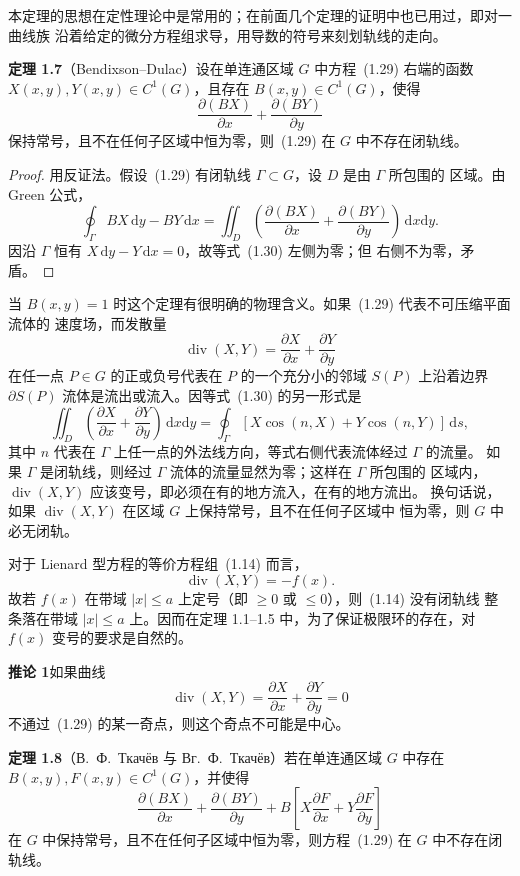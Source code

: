 本定理的思想在定性理论中是常用的；在前面几个定理的证明中也已用过，即对一曲线族
沿着给定的微分方程组求导，用导数的符号来刻划轨线的走向。

\noindent\textbf{定理 1.7}\quad （Bendixson--Dulac）设在单连通区域 $G$ 中方程~(1.29)
右端的函数 $X(x,y),Y(x,y)\in C^1(G)$，且存在 $B(x,y)\in C^1(G)$，使得
\[
  \dfrac{\partial(BX)}{\partial x}+\dfrac{\partial(BY)}{\partial y}
\]
保持常号，且不在任何子区域中恒为零，则~(1.29) 在 $G$ 中不存在闭轨线。

\begin{proof}
用反证法。假设~(1.29) 有闭轨线 $\Gamma\subset G$，设 $D$ 是由 $\Gamma$ 所包围的
区域。由 Green 公式，
\[
  \oint_\Gamma BX\,\mathrm{d}y-BY\,\mathrm{d}x
  =\iint_D\left(\dfrac{\partial(BX)}{\partial x}
  +\dfrac{\partial(BY)}{\partial y}\right)\,\mathrm{d}x\mathrm{d}y. \tag{1.30}
\]
因沿 $\Gamma$ 恒有 $X\,\mathrm{d}y-Y\,\mathrm{d}x=0$，故等式~(1.30) 左侧为零；但
右侧不为零，矛盾。
\end{proof}

当 $B(x,y)=1$ 时这个定理有很明确的物理含义。如果~(1.29) 代表不可压缩平面流体的
速度场，而发散量
\[
  \operatorname{div}(X,Y)=\dfrac{\partial X}{\partial x}
  +\dfrac{\partial Y}{\partial y}
\]
在任一点 $P\in G$ 的正或负号代表在 $P$ 的一个充分小的邻域 $S(P)$ 上沿着边界
$\partial S(P)$ 流体是流出或流入。因等式~(1.30) 的另一形式是
\[
  \iint_D\left(\dfrac{\partial X}{\partial x}
  +\dfrac{\partial Y}{\partial y}\right)\,\mathrm{d}x\mathrm{d}y
  =\oint_\Gamma[X\cos(n,X)+Y\cos(n,Y)]\,\mathrm{d}s,
\]
其中 $n$ 代表在 $\Gamma$ 上任一点的外法线方向，等式右侧代表流体经过 $\Gamma$ 的流量。
如果 $\Gamma$ 是闭轨线，则经过 $\Gamma$ 流体的流量显然为零；这样在 $\Gamma$ 所包围的
区域内，$\operatorname{div}(X,Y)$ 应该变号，即必须在有的地方流入，在有的地方流出。
换句话说，如果 $\operatorname{div}(X,Y)$ 在区域 $G$ 上保持常号，且不在任何子区域中
恒为零，则 $G$ 中必无闭轨。

对于 Lienard 型方程的等价方程组~(1.14) 而言，
\[
  \operatorname{div}(X,Y)=-f(x).
\]
故若 $f(x)$ 在带域 $|x|\leq a$ 上定号（即 $\geq0$ 或 $\leq0$），则~(1.14) 没有闭轨线
整条落在带域 $|x|\leq a$ 上。因而在定理 1.1--1.5 中，为了保证极限环的存在，对
$f(x)$ 变号的要求是自然的。

\noindent\textbf{推论 1}\quad 如果曲线
\[
  \operatorname{div}(X,Y)=\dfrac{\partial X}{\partial x}
  +\dfrac{\partial Y}{\partial y}=0
\]
不通过~(1.29) 的某一奇点，则这个奇点不可能是中心。

\noindent\textbf{定理 1.8}\quad （В.~Ф.~Ткачёв 与 Вг.~Ф.~Ткачёв\cite{21}）若在单连通区域
$G$ 中存在 $B(x,y),F(x,y)\in C^1(G)$，并使得
\[
  \dfrac{\partial(BX)}{\partial x}+\dfrac{\partial(BY)}{\partial y}
  +B\left[X\dfrac{\partial F}{\partial x}+Y\dfrac{\partial F}{\partial y}\right]
\]
在 $G$ 中保持常号，且不在任何子区域中恒为零，则方程~(1.29) 在 $G$ 中不存在闭轨线。


